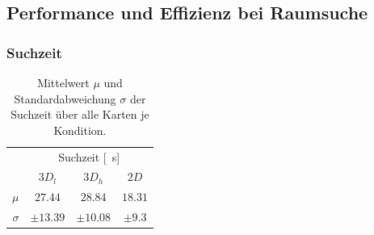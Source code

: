 \subsection{Performance und Effizienz bei Raumsuche}


\subsubsection*{Suchzeit}
\begin{table}
    \centering
    \caption{Mittelwert $\mu$ und Standardabweichung $\sigma$ der Suchzeit über alle Karten je Kondition.}
    \label{tab:searchtime_overview}
    \begin{tabular}{rccc}
        \toprule
        {} & \multicolumn{3}{c}{Suchzeit [\SI{}{\second}]} \\
        {} &          $3D_l$ &          $3D_h$ &          $2D$ \\
        \midrule
        $\mu$    &  $\num{27.44}$     &  $\num{28.84}$     &  $\num{18.31}$ \\
        $\sigma$ &  $\pm \num{13.39}$ &  $\pm \num{10.08}$ &   $\pm \num{9.3}$ \\
        \bottomrule
    \end{tabular}
\end{table}

